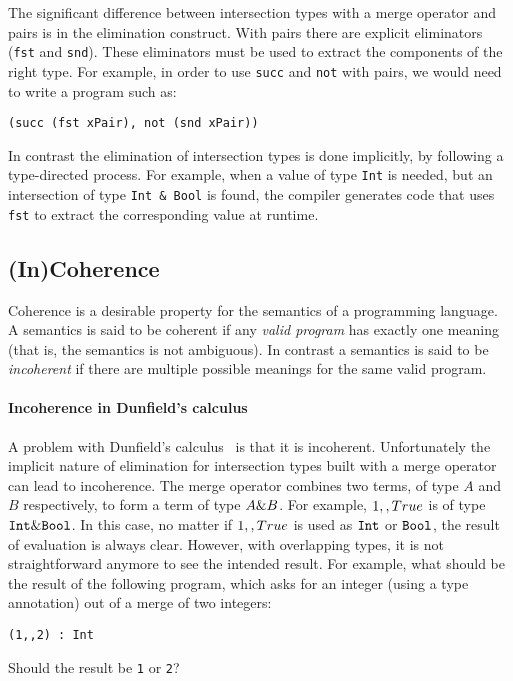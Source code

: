 \noindent The significant difference between intersection types with a
merge operator and pairs is in the elimination construct. With pairs
there are explicit eliminators (\lstinline{fst} and
\lstinline{snd}). These eliminators must be used to extract the
components of the right type. For example, in order to use
\lstinline{succ} and \lstinline{not} with pairs, we would need to
write a program such as:

\begin{lstlisting}
(succ (fst xPair), not (snd xPair))
\end{lstlisting}

\noindent In contrast the elimination of intersection types is done
implicitly, by following a type-directed process. For example,
when a value of type \lstinline{Int} is needed, but an intersection
of type \lstinline{Int & Bool} is found, the compiler generates code 
that uses \lstinline{fst} to extract the corresponding value at runtime.

\subsection{(In)Coherence} \label{subsec:incoherence}

Coherence is a desirable property for the semantics of a programming
language. A semantics is said to be coherent if any \emph{valid
  program} has exactly one meaning~\cite{reynolds1991coherence} (that
is, the semantics is not ambiguous). In contrast a semantics is said
to be \emph{incoherent} if there are multiple possible meanings for
the same valid program. 

\paragraph{Incoherence in Dunfield's calculus}
A problem with Dunfield's calculus~\cite{dunfield2014elaborating} is
that it is incoherent.  Unfortunately the implicit nature of
elimination for intersection types built with a merge operator can
lead to incoherence.  The merge operator combines two terms, of type
$A$ and $B$ respectively, to form a term of type $A \& B$. For
example, $1 ,, True$ is of type $\texttt{Int} \&
\texttt{Bool}$. In this case, no matter if $1 ,, True$ is used as
$\texttt{Int}$ or $\texttt{Bool}$, the result of evaluation is always
clear. However, with overlapping types, it is not straightforward
anymore to see the intended result. For example, what should be the result of
the following program, which asks for an integer (using a type annotation) out
of a merge of two integers:
\begin{lstlisting}
(1,,2) : Int
\end{lstlisting}
Should the result be \lstinline$1$ or \lstinline$2$?

